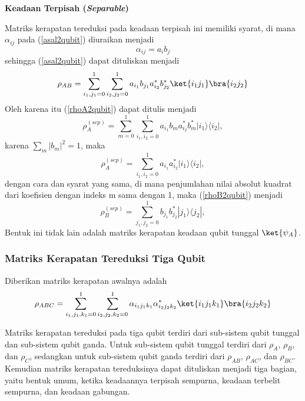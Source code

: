 \textbf{Keadaan Terpisah (\textit{Separable})}
\par
Matriks kerapatan tereduksi pada keadaan terpisah ini memiliki syarat, di mana $\alpha_{ij}$ pada (\ref{asal2qubit}) diuraikan menjadi
\begin{equation}
	\alpha_{ij}=a_ib_j
\end{equation}
sehingga (\ref{asal2qubit}) dapat dituliskan menjadi
\begin{equation}
	\rho_{AB}=\sum_{i_1,j_1=0}^1\sum_{i_2,j_2=0}^1 a_{i_1}b_{j_1} a^{*}_{i_2}b^{*}_{j_2}\ket{i_1j_1}\bra{i_2j_2}
\end{equation}
Oleh karena itu (\ref{rhoA2qubit}) dapat ditulis menjadi
\begin{equation}
	\rho_{A}^{(sep)} = \sum_{m=0}^{1} \sum_{i_1,i_2=0}^{1}a_{i_1}b_m a^{*}_{i_2}b^{*}_m|i_1\rangle \langle i_2|,
\end{equation}
karena $\sum_{m}|b_m|^2=1$, maka
\begin{equation}
	\rho_{A}^{(sep)} = \sum_{i_1,i_2=0}^{1}a_{i_1} a^{*}_{i_2}|i_1\rangle \langle i_2|,
\end{equation}
dengan cara dan syarat yang sama, di mana penjumlahan nilai absolut kuadrat dari koefisien dengan indeks m sama dengan 1, maka (\ref{rhoB2qubit}) menjadi
\begin{equation}
	\rho_{B}^{(sep)} = \sum_{j_1,j_2=0}^{1} b_{j_1}b^{*}_{j_2}|j_1\rangle \langle j_2|,
\end{equation}
Bentuk ini tidak lain adalah matriks kerapatan keadaan qubit tunggal $\ket{\psi_A}$.

\subsubsection{Matriks Kerapatan Tereduksi Tiga Qubit}
Diberikan matriks kerapatan awalnya adalah
\begin{equation}
    \rho_{ABC}=\sum_{i_1,j_1,k_1=0}^1\sum_{i_2,j_2,k_2=0}^1\alpha_{i_1j_1k_1}\alpha^{*}_{i_2j_2k_2}\ket{i_1j_1k_1}\bra{i_2j_2k_2}\label{asal3qubit}
\end{equation}

Matriks kerapatan tereduksi pada tiga qubit terdiri dari sub-sistem qubit tunggal dan sub-sistem qubit ganda. Untuk sub-sistem qubit tunggal terdiri dari $\rho_A$, $\rho_B$, dan $\rho_C$, sedangkan untuk sub-sistem qubit ganda terdiri dari $\rho_{AB}$, $\rho_{AC}$, dan $\rho_{BC}$. Kemudian matriks kerapatan tereduksinya dapat dituliskan menjadi tiga bagian, yaitu bentuk umum, ketika keadaannya terpisah sempurna, keadaan terbelit sempurna, dan keadaan gabungan.

